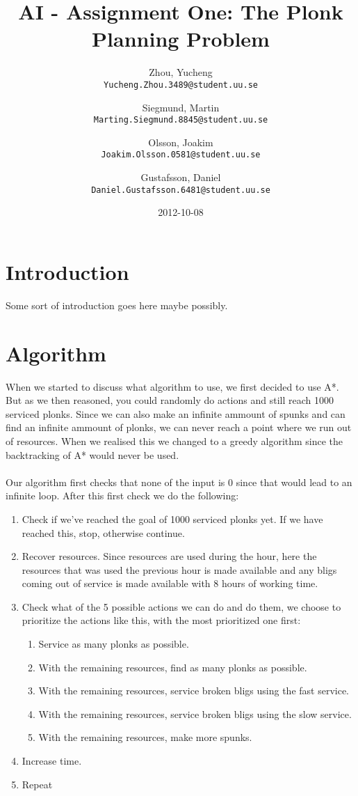 \documentclass{article}
\begin{document}
\title{AI - Assignment One: The Plonk Planning Problem}
\date{2012-10-08}
\author{
	Zhou, Yucheng\\
	\texttt{Yucheng.Zhou.3489@student.uu.se}
	\and
	Siegmund, Martin\\
	\texttt{Marting.Siegmund.8845@student.uu.se}
	\and
	Olsson, Joakim\\
	\texttt{Joakim.Olsson.0581@student.uu.se}
	\and
	Gustafsson, Daniel\\
	\texttt{Daniel.Gustafsson.6481@student.uu.se}
}
\maketitle 

\section*{Introduction}
Some sort of introduction goes here maybe possibly.

\section*{Algorithm}
When we started to discuss what algorithm to use, we first decided to use A*. But as we then reasoned, you could randomly do actions and still reach 1000 serviced plonks. Since we can also make an infinite ammount of spunks and can find an infinite ammount of plonks, we can never reach a point where we run out of resources. When we realised this we changed to a greedy algorithm since the backtracking of A* would never be used.
\\ \\
Our algorithm first checks that none of the input is 0 since that would lead to an infinite loop. After this first check we do the following:
\begin{enumerate}
	\item Check if we've reached the goal of 1000 serviced plonks yet. If we have reached this, stop, otherwise continue.
	\item Recover resources. Since resources are used during the hour, here the resources that was used the previous hour is made available and any bligs coming out of service is made available with 8 hours of working time.
	\item Check what of the 5 possible actions we can do and do them, we choose to prioritize the actions like this, with the most prioritized one first:
	\begin{enumerate}
		\item Service as many plonks as possible.
		\item With the remaining resources, find as many plonks as possible.
		\item With the remaining resources, service broken bligs using the fast service.
		\item With the remaining resources, service broken bligs using the slow service.
		\item With the remaining resources, make more spunks.
	\end{enumerate}
	\item Increase time.
	\item Repeat
\end{enumerate}
\end{document}
